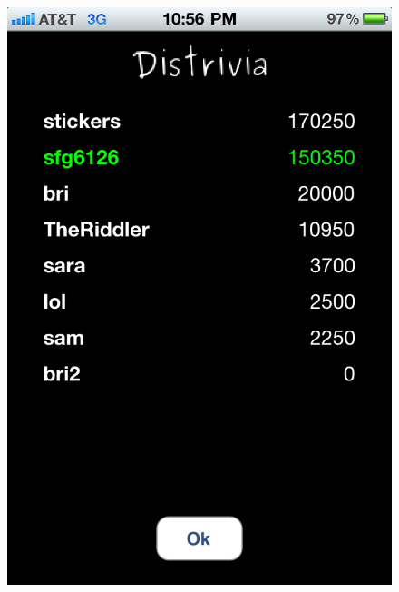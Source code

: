 \documentclass{dependencies/acm_proc_article-sp}
\begin{document}
\begin{figure}[h!]
   \includegraphics[scale=0.12]{iPhone_leaderboard2.png}

\end{figure}
\end{document}
